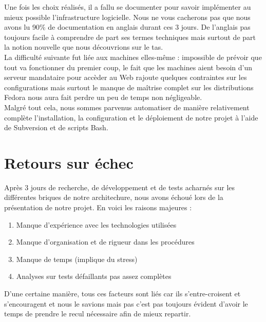 \documentclass[11pt,a4paper]{report}
\begin{document}
            Une fois les choix r\'ealis\'es, il a fallu se documenter pour savoir impl\'ementer au mieux possible l'infrastructure logicielle. Nous ne vous cacherons pas que nous avons lu 90\% de documentation en anglais durant ces 3 jours. De l'anglais pas toujours facile \`a comprendre de part ses termes techniques mais surtout de part la notion nouvelle que nous d\'ecouvrions sur le tas.\\
            
            La difficult\'e suivante fut li\'ee aux machines elles-m\^eme : impossible de pr\'evoir que tout va fonctionner du premier coup, le fait que les machines aient besoin d'un serveur mandataire pour acc\`eder au Web rajoute quelques contraintes sur les configurations mais surtout le manque de ma\^itrise complet sur les distributions Fedora nous aura fait perdre un peu de temps non n\'egligeable.\\
            
            Malgr\'e tout cela, nous sommes parvenus automatiser de mani\`ere relativement compl\`ete l'installation, la configuration et le d\'eploiement de notre projet \`a l'aide de Subversion et de scripts Bash.
            
        \section{Retours sur \'echec}
            
            Apr\`es 3 jours de recherche, de d\'eveloppement et de tests acharn\'es sur les diff\'erentes briques de notre architechure, nous avons \'echou\'e lors de la pr\'esentation de notre projet. En voici les raisons majeures :\\
            
            \begin{enumerate}
                \item Manque d'exp\'erience avec les technologies utilis\'ees
                \item Manque d'organisation et de rigueur dans les proc\'edures
                \item Manque de temps (implique du stress)
                \item Analyses sur tests d\'efaillants pas assez compl\`etes
            \end{enumerate}
            
            D'une certaine mani\`ere, tous ces facteurs sont li\'es car ils s'entre-croisent et s'encouragent et nous le savions mais pas c'est pas toujours \'evident d'avoir le temps de prendre le recul n\'ecessaire afin de mieux repartir.\\
            
\end{document}
